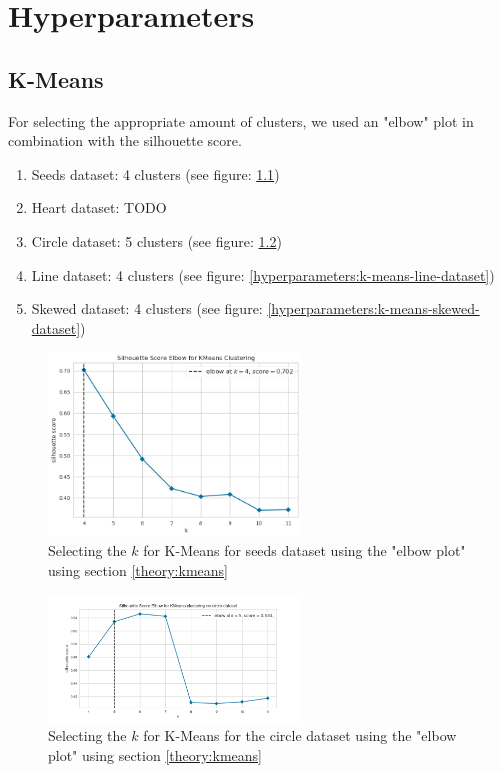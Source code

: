 \chapter{Hyperparameters}
\section{K-Means}
For selecting the appropriate amount of clusters, we used an "elbow" plot in combination with the silhouette score.
\begin{enumerate}
  \item Seeds dataset: 4 clusters (see figure: \ref{hyperparameters:k-means-seeds-dataset})
  \item Heart dataset: TODO
  \item Circle dataset: 5 clusters (see figure: \ref{hyperparameters:k-means-circle-dataset})
  \item Line dataset: 4 clusters (see figure: \ref{hyperparameters:k-means-line-dataset})
  \item Skewed dataset: 4 clusters (see figure: \ref{hyperparameters:k-means-skewed-dataset})
\end{enumerate}
\begin{figure}[H]
  \includegraphics[width=0.6\textwidth]{Appendix/parameter-selection/selecting-k.png}
  \caption{Selecting the $k$ for K-Means for seeds dataset using the "elbow plot" using section \ref{theory:kmeans}}
  \label{hyperparameters:k-means-seeds-dataset}
\end{figure}

\begin{figure}[H]
  \includegraphics[width=0.6\textwidth]{Method/images/synthetic-datasets-k/circle-dataset_elbow.png}
  \caption{Selecting the $k$ for K-Means for the circle dataset using the "elbow plot" using section \ref{theory:kmeans}}
  \label{hyperparameters:k-means-circle-dataset}
\end{figure}



